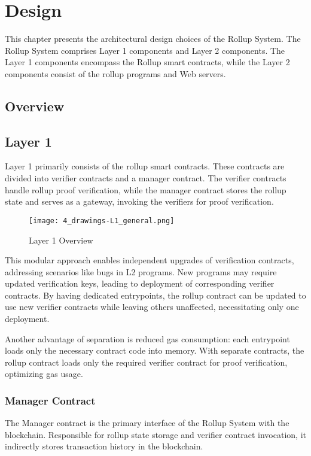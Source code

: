 \chapter{Design\label{cha:chapter4}}
This chapter presents the architectural design choices of the Rollup System. The Rollup System comprises Layer 1 components and Layer 2 components. The Layer 1 components encompass the Rollup smart contracts, while the Layer 2 components consist of the rollup programs and Web servers.

\section{Overview}

\section{Layer 1\label{sec:designLayer1}}
Layer 1 primarily consists of the rollup smart contracts. These contracts are divided into verifier contracts and a manager contract. The verifier contracts handle rollup proof verification, while the manager contract stores the rollup state and serves as a gateway, invoking the verifiers for proof verification.

\begin{figure}[htb]
  \centering
  \texttt{[image: 4\_drawings-L1\_general.png]}
  \caption{Layer 1 Overview}
  \label{fig:Layer1overview}
\end{figure}

This modular approach enables independent upgrades of verification contracts, addressing scenarios like bugs in L2 programs. New programs may require updated verification keys, leading to deployment of corresponding verifier contracts. By having dedicated entrypoints, the rollup contract can be updated to use new verifier contracts while leaving others unaffected, necessitating only one deployment.

Another advantage of separation is reduced gas consumption: each entrypoint loads only the necessary contract code into memory. With separate contracts, the rollup contract loads only the required verifier contract for proof verification, optimizing gas usage.

\subsection{Manager Contract\label{sec:designrollupcontract}}
The Manager contract is the primary interface of the Rollup System with the blockchain. Responsible for rollup state storage and verifier contract invocation, it indirectly stores transaction history in the blockchain.

